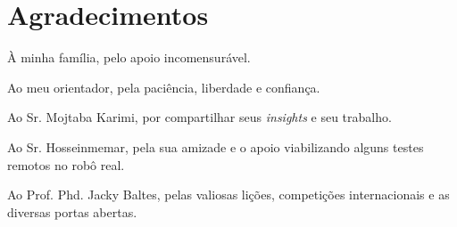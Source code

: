 
\chapter*{Agradecimentos}

À minha família, pelo apoio incomensurável.

Ao meu orientador, pela paciência, liberdade e confiança.

Ao Sr. Mojtaba Karimi, por compartilhar seus \textit{insights} e seu trabalho.

Ao Sr. Hosseinmemar, pela sua amizade e o apoio viabilizando alguns testes remotos no robô real.

Ao Prof. Phd. Jacky Baltes, pelas valiosas lições, competições internacionais e as diversas portas abertas.